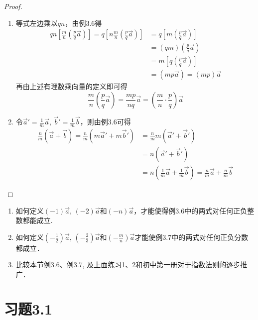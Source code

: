 \begin{proof}
\begin{enumerate}
    \item 等式左边乘以$qn$，由例3.6得
\[\begin{split}
qn\left[\frac{m}{n}\left(\frac{p}{q}\vec{a}\right)\right]=q\left[n\frac{m}{n}\left(\frac{p}{q}\vec{a}\right)\right]&=q\left[m\left(\frac{p}{q}\vec{a}\right)\right]\\
&=(qm)\left(\frac{p}{q}\vec{a}\right)\\
&=m\left[q\left(\frac{p}{q}\vec{a}\right)\right]\\
&=\left(mp\vec{a}\right)=(mp)\vec{a}
\end{split}\]
再由上述有理数乘向量的定义即可得
\[\frac{m}{n}\left(\frac{p}{q}\vec{a}\right)=\frac{mp}{nq}\vec{a}=\left(\frac{m}{n}\cdot \frac{p}{q}\right)\vec{a}\]

\item 令$\vec{a}'=\frac{1}{m}\vec{a}$, $\vec{b}'=\frac{1}{m}\vec{b}$，则由例3.6可得
\[\begin{split}
    \frac{n}{m}\left(\vec{a}+\vec{b}\right)=\frac{n}{m}\left(m\vec{a}'+m\vec{b}'\right)&=\frac{n}{m}m\left(\vec{a}'+\vec{b}'\right)\\
&=n\left(\vec{a}'+\vec{b}'\right)\\
&=n\left(\frac{1}{m}\vec{a}+\frac{1}{m}\vec{b}\right)
=\frac{n}{m}\vec{a}+\frac{n}{m}\vec{b}
\end{split}\]
\end{enumerate}
\end{proof}

\begin{ex}
\begin{enumerate}
    \item 如何定义$(-1)\vec{a}$, $(-2)\vec{a}$和$(-n)\vec{a}$，才能使得例3.6中的两式对任何正负整数都能成立.
    \item 如何定义$\left(-\frac{1}{2}\right)\vec{a}$, $\left(-\frac{2}{3}\right)\vec{a}$和$\left(-\frac{m}{n}\right)\vec{a}$才能使例3.7中的两式对任何正负分数都成立．
    \item 比较本节例3.6、例3.7, 及上面练习1、2和初中第一册对于指数法则的逐步推广．
\end{enumerate}   
\end{ex}

\section*{习题3.1}

